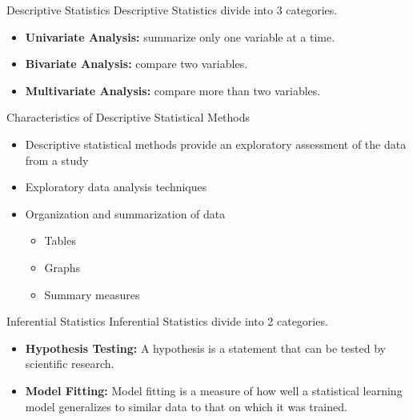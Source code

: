 \documentclass[10pt,dvipsnames, aspectratio=169]{beamer}
\begin{document}
\begin{frame}[t]{Descriptive Statistics}
	Descriptive Statistics divide into 3 categories.
	\begin{itemize}
		\item \textbf{Univariate Analysis:}  summarize only one variable at a 
		time.
		\item \textbf{Bivariate Analysis:}  compare two variables.
		\item \textbf{Multivariate Analysis:}  compare more than two variables.
	\end{itemize}
\end{frame}

\begin{frame}[t]{Characteristics of Descriptive Statistical Methods}
	\begin{itemize}
		\item Descriptive statistical methods provide an exploratory
		assessment of the data from a study
		\item Exploratory data analysis techniques
		\item Organization and summarization of data
		\begin{itemize}
			\item Tables
			\item Graphs
			\item Summary measures
		\end{itemize}
	\end{itemize}
\end{frame}


\begin{frame}[t]{Inferential Statistics}
	Inferential Statistics divide into 2 categories.
	\begin{itemize}
		\item \textbf{Hypothesis
			Testing:} A hypothesis is a statement that can be tested by 
		scientific research.
		\item \textbf{Model Fitting:} Model fitting is a measure of how well a 
		statistical learning model generalizes to similar data to that on which 
		it was trained.
	\end{itemize}
\end{frame}
\end{document}
